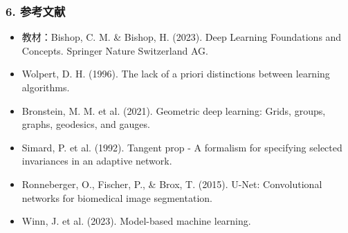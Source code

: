 \documentclass[t,aspectratio=169]{beamer} %
\begin{document}
\begin{frame}
    \frametitle{6. 参考文献}
    \begin{itemize}
        \item 教材：Bishop, C. M. \& Bishop, H. (2023). Deep Learning Foundations and Concepts. Springer Nature Switzerland AG.
        \item Wolpert, D. H. (1996). The lack of a priori distinctions between learning algorithms.
        \item Bronstein, M. M. et al. (2021). Geometric deep learning: Grids, groups, graphs, geodesics, and gauges.
        \item Simard, P. et al. (1992). Tangent prop - A formalism for specifying selected invariances in an adaptive network.
        \item Ronneberger, O., Fischer, P., \& Brox, T. (2015). U-Net: Convolutional networks for biomedical image segmentation.
        \item Winn, J. et al. (2023). Model-based machine learning.
    \end{itemize}
\end{frame}
\end{document}
